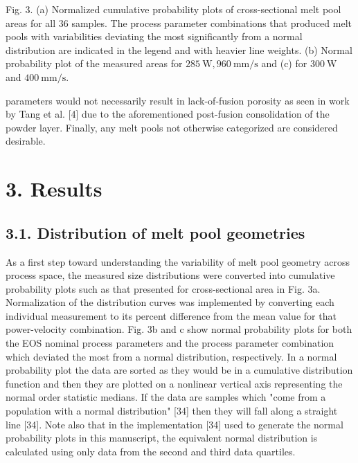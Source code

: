 \documentclass[10pt]{article}
\begin{document}
Fig. 3. (a) Normalized cumulative probability plots of cross-sectional melt pool areas for all 36 samples. The process parameter combinations that produced melt pools with variabilities deviating the most significantly from a normal distribution are indicated in the legend and with heavier line weights. (b) Normal probability plot of the measured areas for $285 \mathrm{~W}, 960 \mathrm{~mm} / \mathrm{s}$ and (c) for $300 \mathrm{~W}$ and $400 \mathrm{~mm} / \mathrm{s}$.

parameters would not necessarily result in lack-of-fusion porosity as seen in work by Tang et al. [4] due to the aforementioned post-fusion consolidation of the powder layer. Finally, any melt pools not otherwise categorized are considered desirable.

\section*{3. Results}
\subsection*{3.1. Distribution of melt pool geometries}
As a first step toward understanding the variability of melt pool geometry across process space, the measured size distributions were converted into cumulative probability plots such as that presented for cross-sectional area in Fig. 3a. Normalization of the distribution curves was implemented by converting each individual measurement to its percent difference from the mean value for that power-velocity combination. Fig. 3b and c show normal probability plots for both the EOS nominal process parameters and the process parameter combination which deviated the most from a normal distribution, respectively. In a normal probability plot the data are sorted as they would be in a cumulative distribution function and then they are plotted on a nonlinear vertical axis representing the normal order statistic medians. If the data are samples which "come from a population with a normal distribution" [34] then they will fall along a straight line [34]. Note also that in the implementation [34] used to generate the normal probability plots in this manuscript, the equivalent normal distribution is calculated using only data from the second and third data quartiles.
\end{document}
